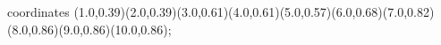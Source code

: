 					coordinates { (1.0,0.39)(2.0,0.39)(3.0,0.61)(4.0,0.61)(5.0,0.57)(6.0,0.68)(7.0,0.82)(8.0,0.86)(9.0,0.86)(10.0,0.86)};